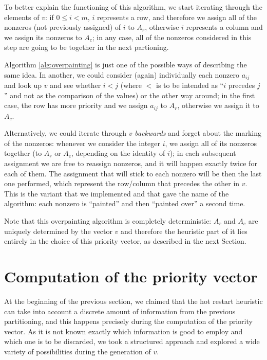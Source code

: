 To better explain the functioning of this algorithm, we start iterating through the elements of $v$: if $0 \leq i < m$, $i$ represents a row, and therefore we assign all of the nonzeros (not previously assigned) of $i$ to $A_r$, otherwise $i$ represents a column and we assign its nonzeros to $A_c$; in any case, all of the nonzeros considered in this step are going to be together in the next partioning.

Algorithm \ref{alg:overpainting} is just one of the possible ways of describing the same idea. In another, we could consider (again) individually each nonzero $a_{ij}$ and look up $v$ and see whether $i < j$ (where $<$ is to be intended as ``$i$ precedes $j$'' and not as the comparison of the values) or the other way around; in the first case, the row has more priority and we assign $a_{ij}$ to $A_r$, otherwise we assign it to $A_c$.

Alternatively, we could iterate through $v$ \emph{backwards} and forget about the marking of the nonzeros: whenever we consider the integer $i$, we assign all of its nonzeros together (to $A_r$ or $A_c$, depending on the identity of $i$); in each subsequent assignment we are free to reassign nonzeros, and it will happen exactly twice for each of them. The assignment that will stick to each nonzero will be then the last one performed, which represent the row/column that precedes the other in $v$. This is the variant that we implemented and that gave the name of the algorithm: each nonzero is ``painted'' and then ``painted over'' a second time.

Note that this overpainting algorithm is completely deterministic: $A_r$ and $A_c$ are uniquely determined by the vector $v$ and therefore the heuristic part of it lies entirely in the choice of this priority vector, as described in the next Section.

\section{Computation of the priority vector}

At the beginning of the previous section, we claimed that the hot restart heuristic can take into account a discrete amount of information from the previous partitioning, and this happens precisely during the computation of the priority vector. As it is not known exactly which information is good to employ and which one is to be discarded, we took a structured approach and explored a wide variety of possibilities during the generation of $v$.

